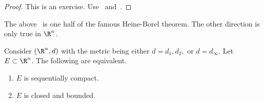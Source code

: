 \begin{proof}
This is an exercise. Use~ and~.
\end{proof}
The above~ is one half of the famous Heine-Borel theorem. The other direction is only true in $\R^n$.
\begin{thm}
	\label{thm:hb_real}
Consider $(\R^n,d)$ with the metric being either $d=d_1,d_2,$ or $d=d_\infty$. Let $E\subset \R^n$. The following are equivalent.
\begin{enumerate}
	\item \label{hb_real_1} $E$ is sequentially compact.
	\item \label{hb_real_2} $E$ is closed and bounded.
\end{enumerate}
\end{thm}
